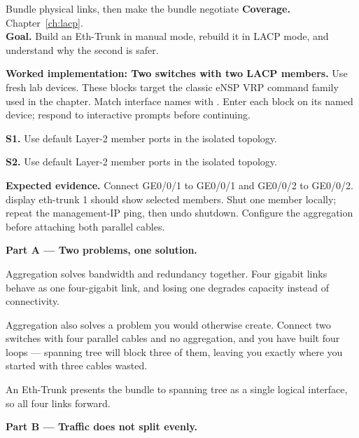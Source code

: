 
\begin{labproject}{Bundle physical links, then make the bundle negotiate}
\textbf{Coverage.} Chapter~\ref{ch:lacp}.\\
\textbf{Goal.} Build an Eth-Trunk in manual mode, rebuild it in LACP mode, and understand why the second is safer.



\noindent\textbf{Worked implementation: Two switches with two LACP members.}
Use fresh lab devices. These blocks target the classic eNSP VRP command family used in the chapter. Match interface names with . Enter each block on its named device; respond to interactive prompts before continuing.

\noindent\textbf{S1.} Use default Layer-2 member ports in the isolated topology.


\noindent\textbf{S2.} Use default Layer-2 member ports in the isolated topology.


\textbf{Expected evidence.} Connect GE0/0/1 to GE0/0/1 and GE0/0/2 to GE0/0/2. display eth-trunk 1 should show selected members. Shut one member locally; repeat the management-IP ping, then undo shutdown. Configure the aggregation before attaching both parallel cables.




\medskip\noindent\textbf{Part A --- Two problems, one solution.}\par
Aggregation solves bandwidth and redundancy together. Four gigabit links behave as one four-gigabit link, and losing one degrades capacity instead of connectivity.

\begin{keyidea}
Aggregation also solves a problem you would otherwise create. Connect two switches with four parallel cables and no aggregation, and you have built four loops --- spanning tree will block three of them, leaving you exactly where you started with three cables wasted.

An Eth-Trunk presents the bundle to spanning tree as a single logical interface, so all four links forward.
\end{keyidea}

\medskip\noindent\textbf{Part B --- Traffic does not split evenly.}\par


\end{labproject}
